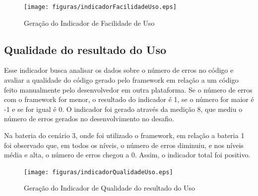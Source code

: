 \begin{figure}[H]
  \centering
  \label{fig:indicador3}
  \texttt{[image: figuras/indicadorFacilidadeUso.eps]}
  \caption{Geração do Indicador de Facilidade de Uso}
\end{figure}

\subsection{Qualidade do resultado do Uso}

Esse indicador busca analisar os dados sobre o número de erros no código e avaliar a qualidade do código gerado pelo
framework em relação a um código feito manualmente pelo desenvolvedor em outra plataforma. Se o número de erros com o
framework for menor, o resultado do indicador é 1, se o número for maior é -1 e se for igual é 0. O indicador foi gerado
através da medição 8, que mediu o número de erros gerados no desenvolvimento no desafio.

Na bateria do cenário 3, onde foi utilizado o framework, em relação a bateria 1 foi observado que, em todos os níveis,
o número de erros diminuiu, e nos níveis média e alta, o número de erros chegou a 0. Assim, o indicador total foi
positivo.

\begin{figure}[H]
  \centering
  \label{fig:indicador4}
  \texttt{[image: figuras/indicadorQualidadeUso.eps]}
  \caption{Geração do Indicador de Qualidade do resultado do Uso}
\end{figure}
